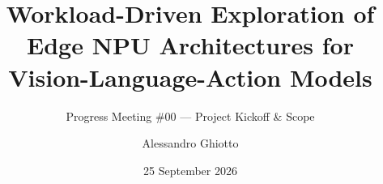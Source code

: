 \documentclass[light]{theme-beamer}
\title[Edge NPU for VLAs]{Workload-Driven Exploration of Edge NPU Architectures for Vision-Language-Action Models}
\subtitle{Progress Meeting \#00 --- Project Kickoff \& Scope}
\author{Alessandro Ghiotto}
\institute{Politecnico di Milano --- MSc in High Performance Computing Engineering}
\date{25 September 2026}
\begin{document}
\begin{frame}
    \titlepage
\end{frame}


\appendix
% 
\end{document}
